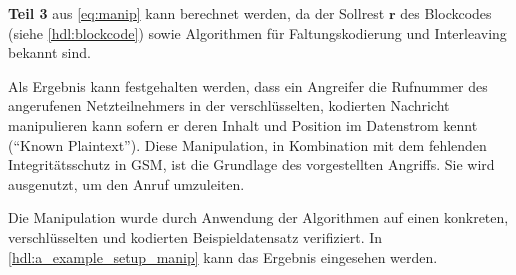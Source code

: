 \textbf{Teil 3} aus \autoref{eq:manip} kann berechnet werden, da der Sollrest $\boldsymbol{r}$ des Blockcodes (siehe \autoref{hdl:blockcode}) sowie Algorithmen für Faltungskodierung und Interleaving bekannt sind.

Als Ergebnis kann festgehalten werden, dass ein Angreifer die Rufnummer des angerufenen Netzteilnehmers in der verschlüsselten, kodierten Nachricht manipulieren kann sofern er deren Inhalt und Position im Datenstrom kennt ("`Known Plaintext"'). Diese Manipulation, in Kombination mit dem fehlenden Integritätsschutz in \ac{GSM}, ist die Grundlage des vorgestellten Angriffs. Sie wird ausgenutzt, um den Anruf umzuleiten.

Die Manipulation wurde durch Anwendung der Algorithmen auf einen konkreten, verschlüsselten und kodierten Beispieldatensatz verifiziert. In \autoref{hdl:a_example_setup_manip} kann das Ergebnis eingesehen werden.